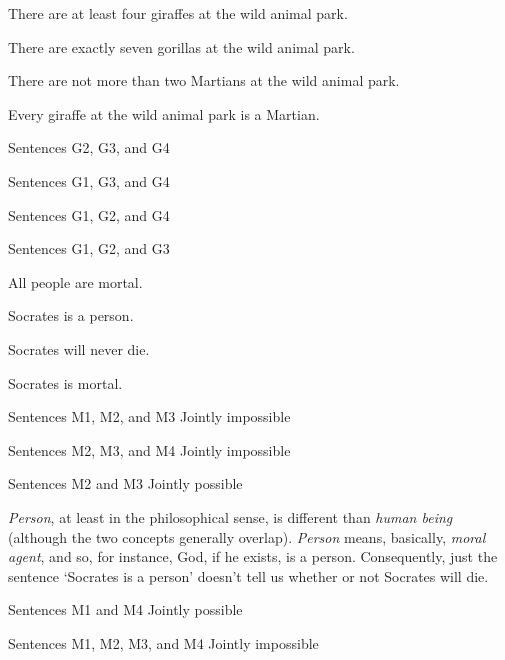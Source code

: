 \noindent\begin{minipage}{0.99\textwidth}
\problempart 
\label{pr.MartianGiraffes} 
\begin{earg}%
\item[G1.] \label{itm:at_least_four}There are at least four giraffes at the wild animal park.
\item[G2.] \label{itm:exactly_seven} There are exactly seven gorillas at the wild animal park.
\item[G3.] \label{itm:not_more_than_two} There are not more than two Martians at the wild animal park.
\item[G4.] \label{itm:martians} Every giraffe at the wild animal park is a Martian.
\end{earg}
\end{minipage}

\begin{earg}
\item Sentences G2, G3, and G4
\hfill {}
\item Sentences G1, G3, and G4
\hfill {}
\item Sentences G1, G2, and G4
\hfill {}
\item Sentences G1, G2, and G3
\hfill {}
\end{earg}

\problempart 
\begin{earg}%
\item[M1.] \label{itm:allmortal} All people are mortal.
\item[M2.] \label{itm:socperson} Socrates is a person.
\item[M3.] \label{itm:socnotdie} Socrates will never die.
\item[M4.] \label{itm:socmortal} Socrates is mortal.
\end{earg}

\begin{earg}
\item Sentences M1, M2, and M3
\hfill Jointly impossible
\item Sentences M2, M3, and M4
\hfill Jointly impossible
\item Sentences M2 and M3
\hfill Jointly possible
\item[] \textit{Person}, at least in the philosophical sense, is different than \textit{human being} (although the two concepts generally overlap). \textit{Person} means, basically, \textit{moral agent}, and so, for instance, God, if he exists, is a person. Consequently, just the sentence `Socrates is a person' doesn't tell us whether or not Socrates will die.\smallskip
\item Sentences M1 and M4
\hfill Jointly possible
\item Sentences M1, M2, M3, and M4
\hfill Jointly impossible
\end{earg}


